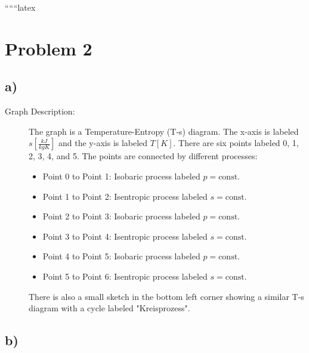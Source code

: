 
``````latex


\section*{Problem 2}

\subsection*{a)}

\begin{description}
    \item[Graph Description:] The graph is a Temperature-Entropy (T-s) diagram. The x-axis is labeled $s \left[ \frac{kJ}{kgK} \right]$ and the y-axis is labeled $T \left[ K \right]$. There are six points labeled 0, 1, 2, 3, 4, and 5. The points are connected by different processes:
    \begin{itemize}
        \item Point 0 to Point 1: Isobaric process labeled $p = \text{const}$.
        \item Point 1 to Point 2: Isentropic process labeled $s = \text{const}$.
        \item Point 2 to Point 3: Isobaric process labeled $p = \text{const}$.
        \item Point 3 to Point 4: Isentropic process labeled $s = \text{const}$.
        \item Point 4 to Point 5: Isobaric process labeled $p = \text{const}$.
        \item Point 5 to Point 6: Isentropic process labeled $s = \text{const}$.
    \end{itemize}
    There is also a small sketch in the bottom left corner showing a similar T-s diagram with a cycle labeled "Kreisprozess".
\end{description}

\subsection*{b)}

